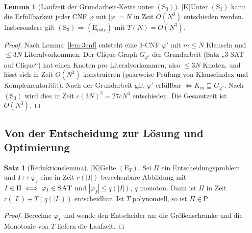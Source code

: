 \documentclass[a4paper,12pt]{article}
\theoremstyle{definition}
\newtheorem{satz}[definition]{Satz}
\newtheorem{lemma}[definition]{Lemma}
\newcommand{\tK}{\textsf{\small[K]}}   %
\newcommand{\cP}{\ensuremath{\mathrm{P}}}
\newcommand{\SAT}{\textsc{SAT}}
\newcommand{\Epoly}{(\mathrm{E}_{\mathrm{poly}})}
\newcommand{\ET}{(\mathrm{E}_{T})}
\newcommand{\Sdrei}{(\mathrm{S}_{3})}
\begin{document}
\begin{lemma}[Laufzeit der Grundarbeit-Kette unter \(\Sdrei\)]\tK\label{lem:S3}
Unter \(\Sdrei\) kann die Erfüllbarkeit jeder CNF \(\varphi\) mit \(|\varphi|=N\) in Zeit \(O(N^3)\) entschieden werden. Insbesondere gilt \(\Sdrei\Rightarrow\Epoly\) mit \(T(N)=O(N^3)\).
\end{lemma}
\begin{proof}
Nach Lemma~\ref{lem:3cnf} entsteht eine 3-CNF \(\varphi'\) mit \(m\le N\) Klauseln und \(\le3N\) Literalvorkommen. Der Clique-Graph \(G_{\varphi'}\) der Grundarbeit (Satz „3-SAT auf Clique“) hat einen Knoten pro Literalvorkommen, also \(\le 3N\) Knoten, und lässt sich in Zeit \(O(N^2)\) konstruieren (paarweise Prüfung von Klauselindex und Komplementarität). Nach der Grundarbeit gilt \(\varphi'\) erfüllbar \(\iff K_m\sqsubseteq G_{\varphi'}\). Nach \(\Sdrei\) wird dies in Zeit \(c(3N)^3=27cN^3\) entschieden. Die Gesamtzeit ist \(O(N^3)\).
\end{proof}

\subsection{Von der Entscheidung zur Lösung und Optimierung}

\begin{satz}[Reduktionslemma]\tK\label{satz:reduktion}
Gelte \(\ET\). Sei \(\Pi\) ein Entscheidungsproblem und \(I\mapsto\varphi_I\) eine in Zeit \(r(|I|)\) berechenbare Abbildung mit \(I\in\Pi\iff\varphi_I\in\SAT\) und \(|\varphi_I|\le q(|I|)\), \(q\) monoton. Dann ist \(\Pi\) in Zeit \(r(|I|)+T(q(|I|))\) entscheidbar. Ist \(T\) polynomiell, so ist \(\Pi\in\cP\).
\end{satz}
\begin{proof}
Berechne \(\varphi_I\) und wende den Entscheider an; die Größenschranke und die Monotonie von \(T\) liefern die Laufzeit.
\end{proof}
\end{document}
